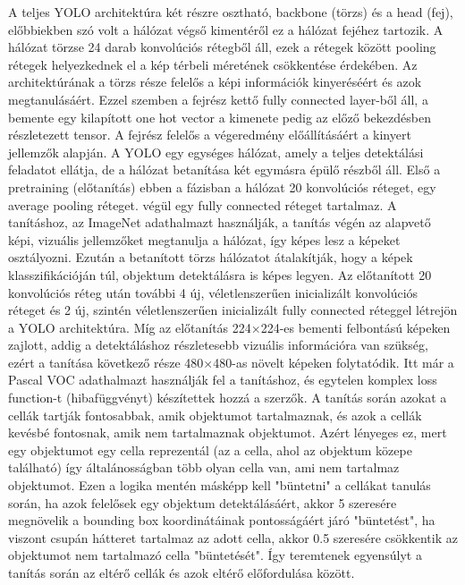 A teljes YOLO architektúra két részre osztható, backbone (törzs) és a
head (fej), előbbiekben szó volt a hálózat végső kimentéről ez a hálózat
fejéhez tartozik. A hálózat törzse 24 darab konvolúciós rétegből áll,
ezek a rétegek között pooling rétegek helyezkednek el a kép térbeli
méretének csökkentése érdekében. Az architektúrának a törzs része
felelős a képi információk kinyeréséért és azok megtanulásáért. Ezzel
szemben a fejrész kettő fully connected layer-ből áll, a bemente egy
kilapított one hot vector a kimenete pedig az előző bekezdésben
részletezett tensor. A fejrész felelős a végeredmény előállításáért a
kinyert jellemzők alapján. A YOLO egy egységes hálózat, amely a teljes
detektálási feladatot ellátja, de a hálózat betanítása két egymásra
épülő részből áll. Első a pretraining (előtanítás) ebben a fázisban a
hálózat 20 konvolúciós réteget, egy average pooling réteget. végül egy
fully connected réteget tartalmaz. A tanításhoz, az ImageNet adathalmazt
használják, a tanítás végén az alapvető képi, vizuális jellemzőket
megtanulja a hálózat, így képes lesz a képeket osztályozni. Ezután a
betanított törzs hálózatot átalakítják, hogy a képek klasszifikációján
túl, objektum detektálásra is képes legyen. Az előtanított 20
konvolúciós réteg után további 4 új, véletlenszerűen inicializált
konvolúciós réteget és 2 új, szintén véletlenszerűen inicializált fully
connected réteggel létrejön a YOLO architektúra. Míg az előtanítás
224×224-es bementi felbontású képeken zajlott, addig a detektáláshoz
részletesebb vizuális információra van szükség, ezért a tanítása
következő része 480×480-as növelt képeken folytatódik. Itt már a Pascal
VOC adathalmazt használják fel a tanításhoz, és egytelen komplex loss
function-t (hibafüggvényt) készítettek hozzá a szerzők. A tanítás során
azokat a cellák tartják fontosabbak, amik objektumot tartalmaznak, és
azok a cellák kevésbé fontosnak, amik nem tartalmaznak objektumot. Azért
lényeges ez, mert egy objektumot egy cella reprezentál (az a cella, ahol
az objektum közepe található) így általánosságban több olyan cella van,
ami nem tartalmaz objektumot. Ezen a logika mentén másképp kell
"büntetni" a cellákat tanulás során, ha azok felelősek egy objektum
detektálásáért, akkor 5 szeresére megnövelik a bounding box
koordinátáinak pontosságáért járó "büntetést", ha viszont csupán
hátteret tartalmaz az adott cella, akkor 0.5 szeresére csökkentik az
objektumot nem tartalmazó cella "büntetését". Így teremtenek egyensúlyt
a tanítás során az eltérő cellák és azok eltérő előfordulása között.

